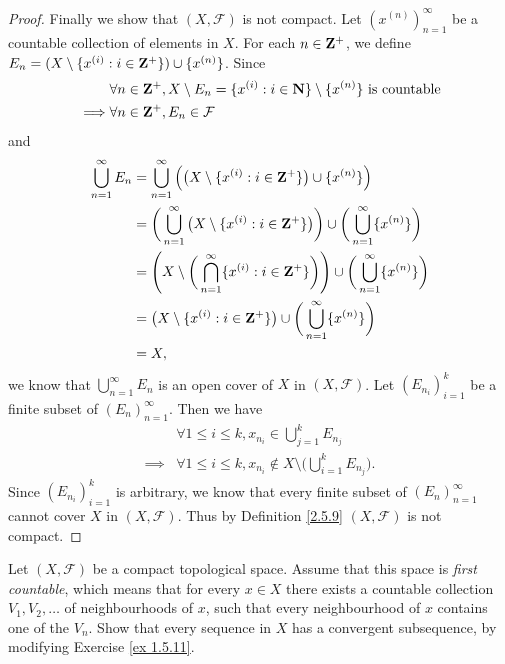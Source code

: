 \begin{proof}
    Finally we show that \((X, \mathcal{F})\) is not compact.
    Let \((x^{(n)})_{n = 1}^\infty\) be a countable collection of elements in \(X\).
    For each \(n \in \mathbf{Z}^+\), we define \(E_n = (X \setminus \{x^{(i)} : i \in \mathbf{Z}^+\}) \cup \{x^{(n)}\}\).
    Since
    \begin{align*}
                 & \forall n \in \mathbf{Z}^+, X \setminus E_n = \{x^{(i)} : i \in \mathbf{N}\} \setminus \{x^{(n)}\} \text{ is countable} \\
        \implies & \forall n \in \mathbf{Z}^+, E_n \in \mathcal{F}
    \end{align*}
    and
    \begin{align*}
        \bigcup_{n = 1}^\infty E_n & = \bigcup_{n = 1}^\infty \Big(\big(X \setminus \{x^{(i)} : i \in \mathbf{Z}^+\}\big) \cup \{x^{(n)}\}\Big)                                        \\
                                   & = \bigg(\bigcup_{n = 1}^\infty \big(X \setminus \{x^{(i)} : i \in \mathbf{Z}^+\}\big)\bigg) \cup \bigg(\bigcup_{n = 1}^\infty \{x^{(n)}\}\bigg)   \\
                                   & = \Bigg(X \setminus \bigg(\bigcap_{n = 1}^\infty \{x^{(i)} : i \in \mathbf{Z}^+\}\bigg)\Bigg) \cup \bigg(\bigcup_{n = 1}^\infty \{x^{(n)}\}\bigg) \\
                                   & = \big(X \setminus \{x^{(i)} : i \in \mathbf{Z}^+\}\big) \cup \bigg(\bigcup_{n = 1}^\infty \{x^{(n)}\}\bigg)                                      \\
                                   & = X,
    \end{align*}
    we know that \(\bigcup_{n = 1}^\infty E_n\) is an open cover of \(X\) in \((X, \mathcal{F})\).
    Let \((E_{n_i})_{i = 1}^k\) be a finite subset of \((E_n)_{n = 1}^\infty\).
    Then we have
    \begin{align*}
                 & \forall 1 \leq i \leq k, x_{n_i} \in \bigcup_{j = 1}^k E_{n_j}                             \\
        \implies & \forall 1 \leq i \leq k, x_{n_i} \notin X \setminus \bigg(\bigcup_{i = 1}^k E_{n_j}\bigg).
    \end{align*}
    Since \((E_{n_i})_{i = 1}^k\) is arbitrary, we know that every finite subset of \((E_n)_{n = 1}^\infty\) cannot cover \(X\) in \((X, \mathcal{F})\).
    Thus by Definition \ref{2.5.9} \((X, \mathcal{F})\) is not compact.
\end{proof}

\setcounter{exercise}{8}
\begin{exercise}\label{ex 2.5.9}
    Let \((X, \mathcal{F})\) be a compact topological space.
    Assume that this space is \emph{first countable}, which means that for every \(x \in X\) there exists a countable collection \(V_1 , V_2 , \dots\) of neighbourhoods of \(x\), such that every neighbourhood of \(x\) contains one of the \(V_n\).
    Show that every sequence in \(X\) has a convergent subsequence, by modifying Exercise \ref{ex 1.5.11}.
\end{exercise}

